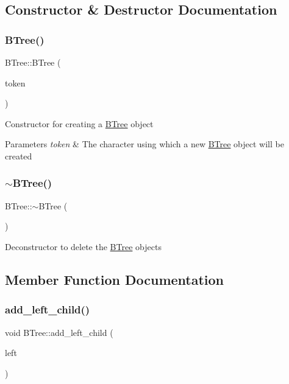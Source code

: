 \subsection{Constructor \& Destructor Documentation}
\mbox{\label{classBTree_a816ccfed62d3bd439b61c03f660d1cc6}} 
\subsubsection{\texorpdfstring{B\+Tree()}{BTree()}}
{\footnotesize\ttfamily B\+Tree\+::\+B\+Tree (\begin{DoxyParamCaption}\item[{char}]{token }\end{DoxyParamCaption})\hspace{0.3cm}{\ttfamily [explicit]}}

Constructor for creating a \hyperlink{classBTree}{B\+Tree} object 
\begin{DoxyParams}{Parameters}
{\em token} & The character using which a new \hyperlink{classBTree}{B\+Tree} object will be created \\
\hline
\end{DoxyParams}
\mbox{\label{classBTree_a1d0dbad21ec825a7c8e5625709010e6c}} 
\subsubsection{\texorpdfstring{$\sim$\+B\+Tree()}{~BTree()}}
{\footnotesize\ttfamily B\+Tree\+::$\sim$\+B\+Tree (\begin{DoxyParamCaption}{ }\end{DoxyParamCaption})}

Deconstructor to delete the \hyperlink{classBTree}{B\+Tree} objects 

\subsection{Member Function Documentation}
\mbox{\label{classBTree_ae80b1f2b89c404206d76e5371c820d7a}} 
\subsubsection{\texorpdfstring{add\+\_\+left\+\_\+child()}{add\_left\_child()}}
{\footnotesize\ttfamily void B\+Tree\+::add\+\_\+left\+\_\+child (\begin{DoxyParamCaption}\item[{\hyperlink{classBTree}{B\+Tree} $\ast$}]{left }\end{DoxyParamCaption})}


